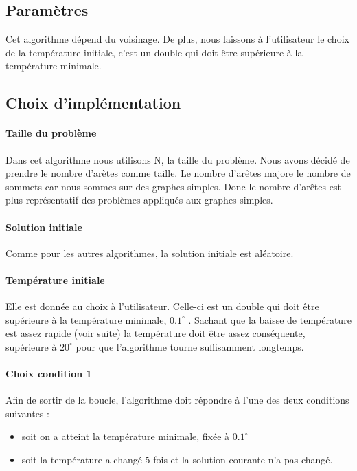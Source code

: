 \documentclass[12pt]{article}
\begin{document}
\subsection{Paramètres}
Cet algorithme dépend du voisinage. De plus, nous laissons à l’utilisateur le choix de la température initiale, c’est un double qui doit être supérieure à la température minimale.

\subsection{Choix d'implémentation}

\paragraph{Taille du problème}
Dans cet algorithme nous utilisons N, la taille du problème. Nous avons décidé de prendre le nombre d’arètes comme taille. Le nombre d’arêtes majore le nombre de sommets car nous sommes sur des graphes simples. Donc le nombre d’arêtes est plus représentatif des problèmes appliqués aux graphes simples.

\paragraph{Solution initiale} Comme pour les autres algorithmes, la solution initiale est aléatoire.

\paragraph{Température initiale} Elle est donnée au choix à l’utilisateur. Celle-ci est un double qui doit être supérieure à la température minimale, $0.1^\circ$ . Sachant que la baisse de température est assez rapide (voir suite) la température doit être assez conséquente, supérieure à $20^\circ$ pour que l’algorithme tourne suffisamment longtemps.

\paragraph{Choix condition 1} Afin de sortir de la boucle, l’algorithme doit répondre à l’une des deux conditions suivantes :
	\begin{itemize}
    \item soit on a atteint la température minimale, fixée à $0.1^\circ$
    \item soit la température a changé 5 fois et la solution courante n’a pas changé.
    \end{itemize}
\end{document}
